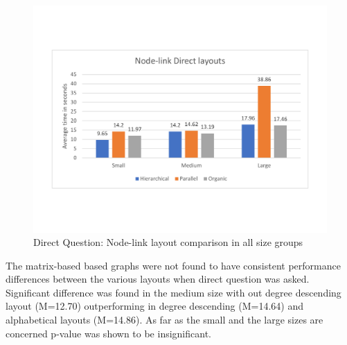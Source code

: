 \documentclass{l4proj}
\begin{document}
\begin{figure}[H]
\centering
\includegraphics[width=15cm]{nodelinkdirectlayouts.pdf}
\caption{Direct Question: Node-link layout comparison in all size groups}
\label{nodelinkdirectlayouts}
\end{figure}

The matrix-based based graphs were not found to have consistent performance differences between the various layouts when direct question was asked. Significant difference was found in the medium size with out degree descending layout (M=12.70) outperforming in degree descending (M=14.64) and alphabetical layouts (M=14.86). As far as the small and the large sizes are concerned p-value was shown to be insignificant.
\end{document}
